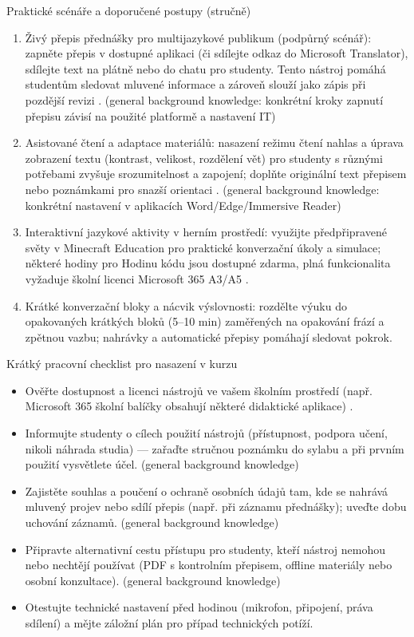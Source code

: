 Praktické scénáře a doporučené postupy (stručně)
\begin{enumerate}
  \item Živý přepis přednášky pro multijazykové publikum (podpůrný scénář): zapněte přepis v dostupné aplikaci (či sdílejte odkaz do Microsoft Translator), sdílejte text na plátně nebo do chatu pro studenty. Tento nástroj pomáhá studentům sledovat mluvené informace a zároveň slouží jako zápis při pozdější revizi \cite{kb_ai_101_tipu_pdf_04e4a115_page_11_1}. (general background knowledge: konkrétní kroky zapnutí přepisu závisí na použité platformě a nastavení IT)
  \item Asistované čtení a adaptace materiálů: nasazení režimu čtení nahlas a úprava zobrazení textu (kontrast, velikost, rozdělení vět) pro studenty s různými potřebami zvyšuje srozumitelnost a zapojení; doplňte originální text přepisem nebo poznámkami pro snazší orientaci \cite{kb_ai_101_tipu_pdf_04e4a115_page_11_1}. (general background knowledge: konkrétní nastavení v aplikacích Word/Edge/Immersive Reader)
  \item Interaktivní jazykové aktivity v herním prostředí: využijte předpřipravené světy v Minecraft Education pro praktické konverzační úkoly a simulace; některé hodiny pro Hodinu kódu jsou dostupné zdarma, plná funkcionalita vyžaduje školní licenci Microsoft 365 A3/A5 \cite{kb_ai_101_tipu_pdf_04e4a115_page_15_2}.
  \item Krátké konverzační bloky a nácvik výslovnosti: rozdělte výuku do opakovaných krátkých bloků (5–10 min) zaměřených na opakování frází a zpětnou vazbu; nahrávky a automatické přepisy pomáhají sledovat pokrok.
\end{enumerate}

Krátký pracovní checklist pro nasazení v kurzu
\begin{itemize}
  \item Ověřte dostupnost a licenci nástrojů ve vašem školním prostředí (např. Microsoft 365 školní balíčky obsahují některé didaktické aplikace) \cite{kb_ai_101_tipu_pdf_04e4a115_page_15_2}.
  \item Informujte studenty o cílech použití nástrojů (přístupnost, podpora učení, nikoli náhrada studia) — zařaďte stručnou poznámku do sylabu a při prvním použití vysvětlete účel. (general background knowledge)
  \item Zajistěte souhlas a poučení o ochraně osobních údajů tam, kde se nahrává mluvený projev nebo sdílí přepis (např. při záznamu přednášky); uveďte dobu uchování záznamů. (general background knowledge)
  \item Připravte alternativní cestu přístupu pro studenty, kteří nástroj nemohou nebo nechtějí používat (PDF s kontrolním přepisem, offline materiály nebo osobní konzultace). (general background knowledge)
  \item Otestujte technické nastavení před hodinou (mikrofon, připojení, práva sdílení) a mějte záložní plán pro případ technických potíží.
\end{itemize}

